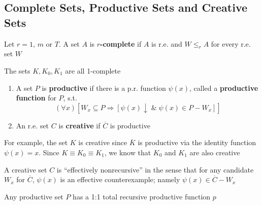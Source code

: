\documentclass[11pt]{article}
\begin{document}
\subsection{Complete Sets, Productive Sets and Creative Sets}
\label{sec:org0c6e139}
\begin{definition}[]
Let \(r=1\), \(m\) or \(T\). A set \(A\) is \textbf{\(r\)-complete} if \(A\) is r.e.
and \(W\le_r A\) for every r.e. set \(W\)
\end{definition}

\begin{theorem}[]
\label{thm2.4.2}
The sets \(K,K_0,K_1\) are all 1-complete
\end{theorem}

\begin{definition}[]
\begin{enumerate}
\item A set \(P\) is \textbf{productive} if there is a p.r. function \(\psi(x)\),
called a \textbf{productive function} for \(P\), s.t.
\begin{equation*}
(\forall x)[W_x\subseteq P\Longrightarrow[\psi(x)\downarrow\;
\&\;\psi(x)\in P-W_x]]
\end{equation*}
\item An r.e. set \(C\) is \textbf{creative} if \(\overbar{C}\) is productive
\end{enumerate}
\end{definition}

For example, the set \(K\) is creative since \(\overbar{K}\) is productive
via the identity function \(\psi(x)=x\). Since \(K\equiv K_0\equiv K_1\), we
know that \(K_0\) and \(K_1\) are also creative

A creative set \(C\) is ``effectively nonrecursive'' in the sense that for any
candidate \(W_x\) for \(\overbar{C}\), \(\psi(x)\) is an effective
counterexample; namely \(\psi(x)\in\overbar{C}-W_x\)

\begin{theorem}[]
Any productive set \(P\) has a 1:1 total recursive productive function \(p\)
\end{theorem}
\end{document}
